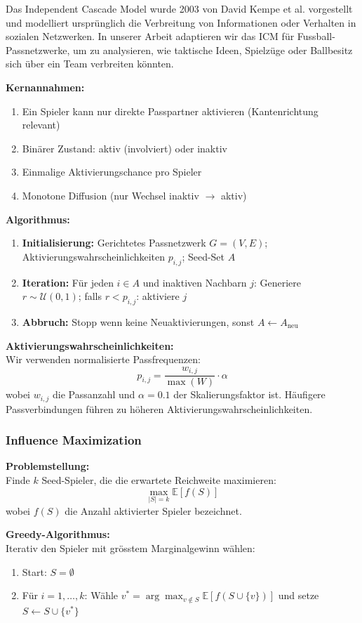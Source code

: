 Das Independent Cascade Model wurde 2003 von David Kempe et al. vorgestellt \cite{arxiv_2024} und modelliert ursprünglich die Verbreitung von Informationen oder Verhalten in sozialen Netzwerken. In unserer Arbeit adaptieren wir das ICM für Fussball-Passnetzwerke, um zu analysieren, wie taktische Ideen, Spielzüge oder Ballbesitz sich über ein Team verbreiten könnten.

\textbf{Kernannahmen:}
\begin{enumerate}
  \item Ein Spieler kann nur direkte Passpartner aktivieren (Kantenrichtung relevant)
  \item Binärer Zustand: aktiv (involviert) oder inaktiv
  \item Einmalige Aktivierungschance pro Spieler
  \item Monotone Diffusion (nur Wechsel inaktiv $\rightarrow$ aktiv)
\end{enumerate}

\textbf{Algorithmus:}
\begin{enumerate}
  \item \textbf{Initialisierung:} Gerichtetes Passnetzwerk $G = (V, E)$; Aktivierungswahrscheinlichkeiten $p_{i,j}$; Seed-Set $A$
  \item \textbf{Iteration:} Für jeden $i \in A$ und inaktiven Nachbarn $j$: Generiere $r \sim \mathcal{U}(0,1)$; falls $r < p_{i,j}$: aktiviere $j$
  \item \textbf{Abbruch:} Stopp wenn keine Neuaktivierungen, sonst $A \leftarrow A_{\text{neu}}$
\end{enumerate}

\textbf{Aktivierungswahrscheinlichkeiten:}\\
Wir verwenden normalisierte Passfrequenzen:
\[
p_{i,j} = \frac{w_{i,j}}{\max(W)} \cdot \alpha
\]
wobei $w_{i,j}$ die Passanzahl und $\alpha = 0.1$ der Skalierungsfaktor ist. Häufigere Passverbindungen führen zu höheren Aktivierungswahrscheinlichkeiten.

\subsubsection{Influence Maximization}

\textbf{Problemstellung:}\\
Finde $k$ Seed-Spieler, die die erwartete Reichweite maximieren:
\[
\max_{|S|=k} \mathbb{E}[f(S)]
\]
wobei $f(S)$ die Anzahl aktivierter Spieler bezeichnet.

\textbf{Greedy-Algorithmus:}\\
Iterativ den Spieler mit grösstem Marginalgewinn wählen:
\begin{enumerate}
  \item Start: $S = \emptyset$
  \item Für $i = 1, \ldots, k$: Wähle $v^* = \arg\max_{v \notin S} \mathbb{E}[f(S \cup \{v\})]$ und setze $S \leftarrow S \cup \{v^*\}$
\end{enumerate}

